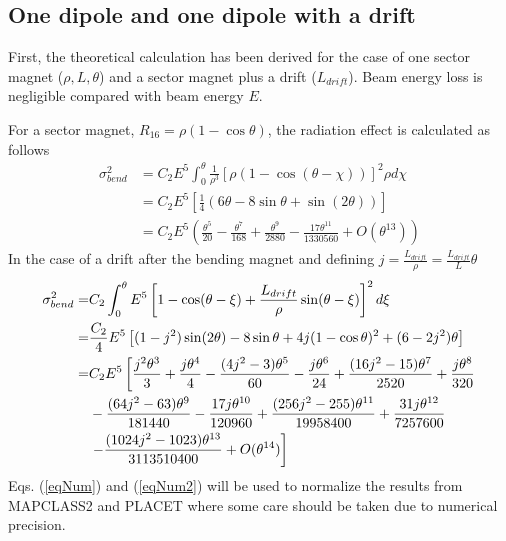 \subsection{One dipole and one dipole with a drift}
First, the theoretical calculation has been derived for the case of one sector magnet ($\rho,L,\theta$) and a sector magnet plus a drift ($L_{drift}$). Beam energy loss is negligible compared with beam energy $E$.\par
For a sector magnet, $R_{16}= \rho(1-\cos\theta)$, the radiation effect is calculated as follows
\begin{align}
\sigma_{bend}^2 &= C_2 E^5\int_0^\theta \frac{1}{\rho^3}[\rho(1-\cos(\theta-\chi))]^2\rho d\chi\\
&= C_2E^5\left[\frac{1}{4}(6\theta-8\sin\theta+\sin(2\theta))\right]\label{eqNum}\\
&=C_2E^5\left(\frac{\theta^5}{20}-\frac{\theta^7}{168}+\frac{\theta^9}{2880}-\frac{17\theta^{11}}{1330560}+O(\theta^{13})\right)
\end{align} 
 In the case of a drift after the bending magnet and defining $j=\frac{L_{drift}}{\rho}=\frac{L_{drift}}{L}\theta$
\begin{align}
  \sigma_{bend}^2 =& C_2 \int_0^\theta E^5\left[1-\cos(\theta-\xi)+\frac{L_{drift}}{\rho}\sin(\theta-\xi)\right]^2 d\xi\\
 =& \frac{C_2}{4} E^5 \left[(1-j^2)\sin(2\theta)-8\sin\theta+4j(1-\cos\theta)^2+(6-2j^2)\theta\right]\label{eqNum2}\\
  =& C_2 E^5 \left[\frac{j^2\theta^3}{3}+\frac{j\theta^4}{4}-\frac{(4j^2-3)\theta^5}{60}- \frac{j\theta^6}{24} +\frac{(16j^2-15)\theta^7}{2520}+\frac{j\theta^8}{320}\right.\notag\\
    &-\frac{(64j^2-63)\theta^9}{181440}-\frac{17j\theta^{10}}{120960}+\frac{(256j^2-255)\theta^{11}}{19958400}+\frac{31j\theta^{12}}{7257600}\notag\\
    &\left.-\frac{(1024j^2-1023)\theta^{13}}{3113510400}+O(\theta^{14})\right]
\end{align}
Eqs. (\ref{eqNum}) and (\ref{eqNum2}) will be used to normalize the results from MAPCLASS2 and PLACET \cite{Placet} where some care should be taken due to numerical precision.\par
